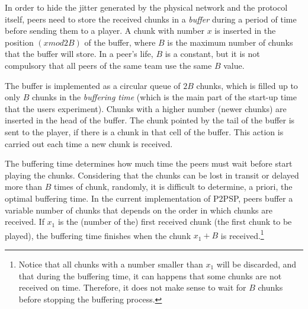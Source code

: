 
\label{sec:buffering_chunks}

In order to hide the jitter generated by the physical network and the
protocol itself, peers need to store the received chunks in a
\emph{buffer} during a period of time before sending them to a
player. A chunk with number $x$ is inserted in the position $(x
\mathit{mod} 2B)$ of the buffer, where $B$ is the maximum number of
chunks that the buffer will store. In a peer's life, $B$ is a
constant, but it is not compulsory that all peers of the same team use
the same $B$ value.

The buffer is implemented as a circular queue of $2B$ chunks, which is
filled up to only $B$ chunks in the \emph{buffering time} (which is the main
part of the start-up time that the users experiment). Chunks with a
higher number (newer chunks) are inserted in the head of the
buffer. The chunk pointed by the tail of the buffer is sent to the
player, if there is a chunk in that cell of the buffer. This action
is carried out each time a new chunk is received.

The buffering time determines how much time the peers must wait before
start playing the chunks. Considering that the chunks can be lost in
transit or delayed more than $B$ times of chunk, randomly, it is
difficult to determine, a priori, the optimal buffering time. In the
current implementation of P2PSP, peers buffer a variable number of
chunks that depends on the order in which chunks are received. If
$x_1$ is the (number of the) first received chunk (the first chunk to
be played), the buffering time finishes when the chunk $x_1+B$ is
received.\footnote{Notice that all chunks with a number smaller than
  $x_1$ will be discarded, and that during the buffering time, it can
  happens that some chunks are not received on time. Therefore, it
  does not make sense to wait for $B$ chunks before stopping the
  buffering process.}


\begin{comment}
An heuristic that
works is the described in the Fig.~\ref{fig:DBS_peer_buffering}. As
can be seen, $\text{chunk\_to\_play}$ points to the first received
chunk, that not necessary is the received chunk with lower
index. After that, the
buffering finishes when a chunk with index $\text{chunk\_to\_play} +
\text{BUFFER\_SIZE}/2$ has been received.\footnote{This not means that
  $\text{BUFFER\_SIZE}/2$ chunks are available in the buffer.}
\end{comment}
